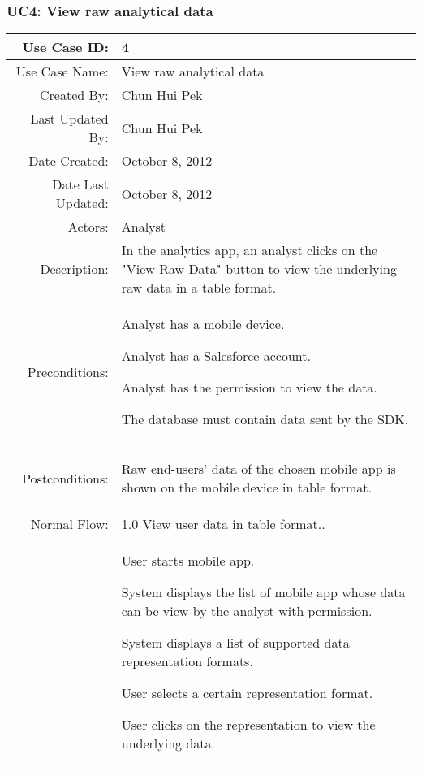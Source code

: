 \documentclass[12pt,oneside,letterpaper]{article}
\newenvironment{packed_enumerate}{ %
\vspace{-7mm}
\begin{enumerate}
  \setlength{\itemsep}{0pt}
  \setlength{\parskip}{0pt}
  \setlength{\parsep}{0pt}
}{\end{enumerate}
\vspace{-8mm}}
\begin{document}
\subsubsection{\label{View raw analytical data}UC4: View raw analytical data}
\begin{longtable}{|r|p{3.8in}|}
\hline
Use Case ID:&4\\
\hline
Use Case Name:&View raw analytical data\\
\hline
Created By:&Chun Hui Pek\\
\hline
Last Updated By:&Chun Hui Pek\\
\hline
Date Created:&October 8, 2012\\
\hline
Date Last Updated:&October 8, 2012\\
\hline
Actors:&Analyst\\
\hline
Description:&In the analytics app, an analyst clicks on the "View Raw Data" button to view the underlying raw data in a table format.\\
\hline
Preconditions:&
\begin{packed_enumerate}
\item Analyst has a mobile device.
\item Analyst has a Salesforce account.
\item Analyst has the permission to view the data.
\item The database must contain data sent by the SDK.
\end{packed_enumerate}\\
\hline
Postconditions:&
\begin{packed_enumerate}
\item Raw end-users’ data of the chosen mobile app is shown on the mobile device in table format.
\end{packed_enumerate}\\
\hline
Normal Flow:&1.0 View user data in table format..\\
&  %
\begin{packed_enumerate}
\item User starts mobile app.
\item System displays the list of mobile app whose data can be view by the analyst with permission.
\item System displays a list of supported data representation formats.
\item User selects a certain representation format.
\item User clicks on the representation to view the underlying data.

\end{packed_enumerate}
\end{longtable}
\end{document}
